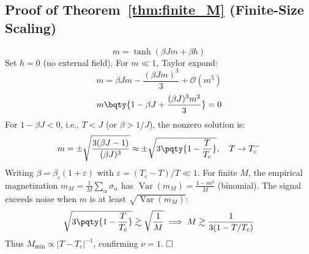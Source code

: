 \documentclass[12pt,a4paper]{article}
\begin{document}
\subsection{Proof of Theorem~\ref{thm:finite_M} (Finite-Size Scaling)}
\begin{equation}
m = \tanh(\beta J m + \beta h)
\end{equation}
Set \(h = 0\) (no external field). For \(m \ll 1\), Taylor expand:
\begin{equation}
m = \beta J m - \frac{(\beta J m)^3}{3} + \mathcal{O}(m^5)
\end{equation}
\begin{equation}
m\bqty{1 - \beta J + \frac{(\beta J)^3 m^2}{3}} = 0
\end{equation}
For \(1 - \beta J < 0\), i.e., \(T < J\) (or \(\beta > 1/J\)), the nonzero solution is:
\begin{equation}
m = \pm \sqrt{\frac{3(\beta J - 1)}{(\beta J)^3}} \approx \pm \sqrt{3\pqty{1 - \frac{T}{T_c}}}, \quad T \to T_c^-
\end{equation}
Writing \(\beta = \beta_c(1 + \varepsilon)\) with \(\varepsilon = (T_c - T)/T \ll 1\). For finite \(M\), the empirical magnetization \(m_M = \frac{1}{M}\sum_\alpha \sigma_\alpha\) has \(\operatorname{Var}(m_M) = \frac{1 - m^2}{M}\) (binomial). The signal exceeds noise when \(m\) is at least \(\sqrt{\operatorname{Var}(m_M)}\):
\begin{equation}
\sqrt{3\pqty{1 - \frac{T}{T_c}}} \gtrsim \sqrt{\frac{1}{M}} \implies M \gtrsim \frac{1}{3(1 - T/T_c)}
\end{equation}
Thus \(M_{\min} \propto |T - T_c|^{-1}\), confirming \(\nu = 1\). \(\hfill \square\)
\end{document}

